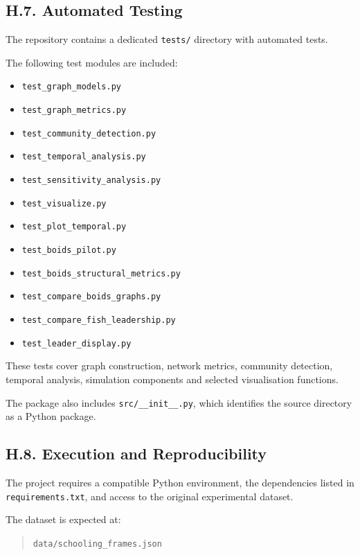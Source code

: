 \documentclass[10pt,a4paper]{article}
\begin{document}
\subsection*{H.7. Automated Testing}

The repository contains a dedicated
\texttt{tests/} directory with automated tests.

The following test modules are included:

\begin{itemize}
    \item \texttt{test\_graph\_models.py}
    \item \texttt{test\_graph\_metrics.py}
    \item \texttt{test\_community\_detection.py}
    \item \texttt{test\_temporal\_analysis.py}
    \item \texttt{test\_sensitivity\_analysis.py}
    \item \texttt{test\_visualize.py}
    \item \texttt{test\_plot\_temporal.py}
    \item \texttt{test\_boids\_pilot.py}
    \item \texttt{test\_boids\_structural\_metrics.py}
    \item \texttt{test\_compare\_boids\_graphs.py}
    \item \texttt{test\_compare\_fish\_leadership.py}
    \item \texttt{test\_leader\_display.py}
\end{itemize}

These tests cover graph construction, network
metrics, community detection, temporal analysis,
simulation components and selected visualisation
functions.

The package also includes \texttt{src/\_\_init\_\_.py},
which identifies the source directory as a
Python package.

\subsection*{H.8. Execution and Reproducibility}

The project requires a compatible Python environment,
the dependencies listed in \texttt{requirements.txt},
and access to the original experimental dataset.

The dataset is expected at:

\begin{quote}
\texttt{data/schooling\_frames.json}
\end{quote}
\end{document}
